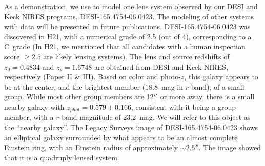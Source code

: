 
As a demonstration, we use \gigal \citep{gu2022a} to model one lens system observed by our DESI and Keck NIRES programs, \href{https://www.legacysurvey.org/viewer/?ra=165.4753&dec=-6.0424&layer=ls-dr9&pixscale=0.262&zoom=16}{DESI-165.4754-06.0423}.
The modeling of other systems with \hst data will be presented in future publications.
DESI-165.4754-06.0423 was discovered in H21, with a numerical grade of 2.5 (out of 4), corresponding to a C~grade 
(In H21, we mentioned that all candidates with a human inspection score $\geq 2.5$ are likely lensing systems).
The lens and source redshifts of $z_d = 0.4834$ and
$z_s = 1.6748$ are obtained from DESI and Keck NIRES, respectively (Paper II \& III).
Based on color and photo-$z$, 
this galaxy appears to be at the center, 
and the brightest member (18.8~mag in $r$-band), of a small group.
While most other group members are 12$^{\prime \prime}$ or more away, 
there is a small nearby galaxy with $z_{phot} = 0.579\pm 0.166$, consistent with it being a group member, 
with a $r$-band magnitude of 23.2~mag.
We will refer to this object as the ``nearby galaxy''.
The Legacy Surveys image of DESI-165.4754-06.0423 shows an elliptical galaxy surrounded by what appears to be an almost complete Einstein ring, with an Einstein radius of approximately $\sim 2.5''$.
The \hst image showed that it is a quadruply lensed system. 



